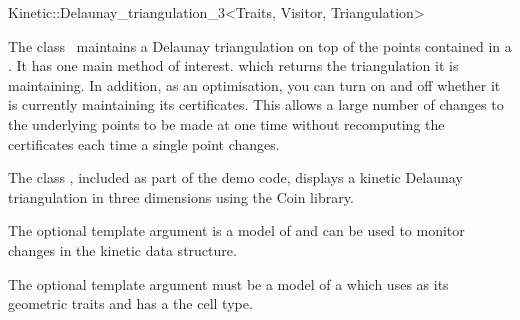 

\begin{ccRefClass}{Kinetic::Delaunay_triangulation_3<Traits, Visitor, Triangulation>}  %


\ccDefinition
  
The class \ccRefName\ maintains a Delaunay triangulation on top of the
points contained in a . It has one main method
of interest.  which returns the triangulation it
is maintaining. In addition, as an optimisation, you can turn on and
off whether it is currently maintaining its certificates. This allows
a large number of changes to the underlying points to be made at one
time without recomputing the certificates each time a single point
changes.

The class , included as part
of the demo code, displays a kinetic Delaunay triangulation in three
dimensions using the Coin library.

The optional  template argument is a model of
 and can be used to monitor
changes in the kinetic data structure.

The optional  template argument must be a model of
a  which uses
 as its geometric traits and has
 a the cell
type.



\ccTypes



\end{ccRefClass}
